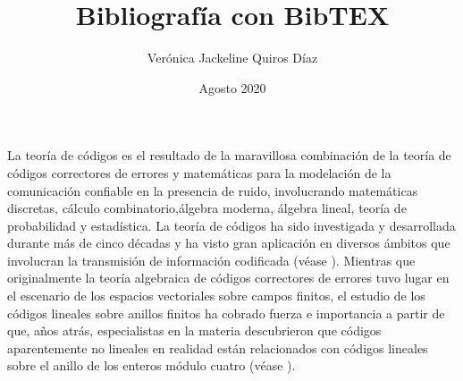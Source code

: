 \documentclass[12pt]{article}
\title{Bibliografía con BibTEX}
\author{Verónica Jackeline Quiros Díaz}
\date{Agosto 2020}
\begin{document}
\maketitle
La teoría de códigos es el resultado de la maravillosa combinación de la teoría de códigos correctores de errores y matemáticas para la modelación de la comunicación confiable en la presencia de ruido, involucrando matemáticas discretas, cálculo combinatorio,álgebra moderna, álgebra lineal, teoría de probabilidad y estadística. La teoría de códigos ha sido investigada y desarrollada durante más de cinco décadas y ha visto gran aplicación en diversos ámbitos que involucran la transmisión de información codificada (véase \cite{Lint} ). Mientras que originalmente la teoría algebraica de códigos correctores de errores tuvo lugar en el escenario de los espacios vectoriales sobre campos finitos, el estudio de los códigos lineales sobre anillos finitos ha cobrado fuerza e importancia a partir de que, a\~{n}os atrás, especialistas en la materia descubrieron que códigos aparentemente no lineales en realidad están relacionados con códigos lineales sobre el anillo de los enteros módulo cuatro
(véase \cite{calderbank}). 



\nocite{*}
%
%
%
%
\end{document}
